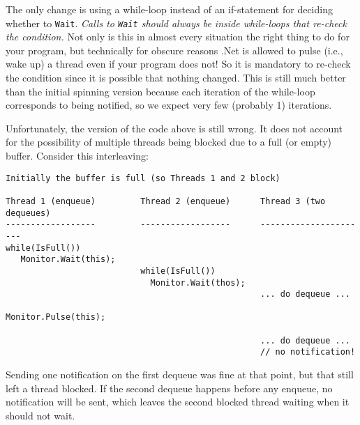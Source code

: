 \documentclass[10pt]{article}
\begin{document}
The only change is using a while-loop instead of an if-statement for
deciding whether to {\tt Wait}.  \emph{Calls to {\tt Wait} should
  always be inside while-loops that re-check the condition.}  Not only
is this in almost every situation the right thing to do for your
program, but technically for obscure reasons .Net is allowed to pulse
(i.e., wake up) a thread even if your program does not!  So it is
mandatory to re-check the condition since it is possible that nothing
changed.  This is still much better than the initial spinning version
because each iteration of the while-loop corresponds to being
notified, so we expect very few (probably 1) iterations.

Unfortunately, the version of the code above is still wrong.  It does
not account for the possibility of multiple threads being blocked due
to a full (or empty) buffer.  Consider this interleaving:
\begin{verbatim}
Initially the buffer is full (so Threads 1 and 2 block)

Thread 1 (enqueue)         Thread 2 (enqueue)      Thread 3 (two dequeues)
------------------         ------------------      ----------------------
while(IsFull())
   Monitor.Wait(this);
                           while(IsFull())
                             Monitor.Wait(thos);
                                                   ... do dequeue ...
                                                   Monitor.Pulse(this);

                                                   ... do dequeue ...
                                                   // no notification!
\end{verbatim}
Sending one notification on the first dequeue was fine at that point,
but that still left a thread blocked.  If the second dequeue happens
before any enqueue, no notification will be sent, which leaves the
second blocked thread waiting when it should not wait.  
\end{document}
